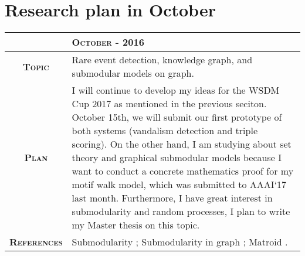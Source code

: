 \documentclass[12pt,twoside]{article}
\begin{document}
\section{Research plan in October}

\begin{center}
  \renewcommand{\arraystretch}{1.5}
  \begin{longtable}{| c | p{12cm} |}
  \hline
  & \textbf{\textsc{October - 2016}} \\ \hline
  \textbf{\textsc{Topic}} & Rare event detection, knowledge graph,
  and submodular models on graph.\\ \hline
  \textbf{\textsc{Plan}} & I will continue to develop my ideas for
  the WSDM Cup 2017 as mentioned in the previous seciton. October 15th,
  we will submit our first prototype of both systems (vandalism detection
  and triple scoring). On the other hand, I am studying about set theory
  and graphical submodular models because I want to conduct a concrete 
  mathematics proof for my motif walk model, which was submitted to
  AAAI`17 last month. Furthermore, I have great interest in submodularity
  and random processes, I plan to write my Master thesis on this topic.
  \\ \hline
  \textbf{\textsc{References}} & Submodularity \cite{submodularity}; 
  Submodularity in graph \cite{sgraph}; Matroid \cite{matroid}.
  \\ \hline
  \end{longtable}
\end{center}
\medskip
\end{document}
